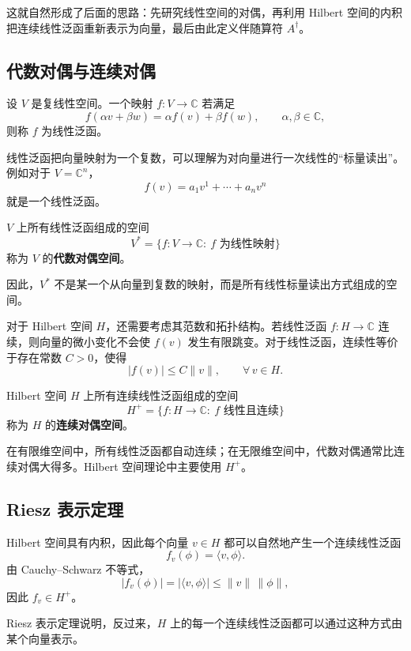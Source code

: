 \documentclass[UTF8,a4paper,11pt,openany]{ctexbook}
\begin{document}
这就自然形成了后面的思路：先研究线性空间的对偶，再利用 Hilbert 空间的内积把连续线性泛函重新表示为向量，最后由此定义伴随算符 $A^\dagger$。

\subsection{代数对偶与连续对偶}

设 $V$ 是复线性空间。一个映射 $f:V\to\mathbb C$ 若满足
\[
f(\alpha v+\beta w)
=
\alpha f(v)+\beta f(w),
\qquad
\alpha,\beta\in\mathbb C,
\]
则称 $f$ 为线性泛函。

线性泛函把向量映射为一个复数，可以理解为对向量进行一次线性的“标量读出”。例如对于 $V=\mathbb C^n$，
\[
f(v)
=
a_1v^1+\cdots+a_nv^n
\]
就是一个线性泛函。

\begin{definition}[代数对偶空间]
$V$ 上所有线性泛函组成的空间
\[
V^*
=
\{f:V\to\mathbb C:\ f\text{ 为线性映射}\}
\]
称为 $V$ 的\textbf{代数对偶空间}。
\end{definition}

因此，$V^*$ 不是某一个从向量到复数的映射，而是所有线性标量读出方式组成的空间。

对于 Hilbert 空间 $H$，还需要考虑其范数和拓扑结构。若线性泛函 $f:H\to\mathbb C$ 连续，则向量的微小变化不会使 $f(v)$ 发生有限跳变。对于线性泛函，连续性等价于存在常数 $C>0$，使得
\[
|f(v)|
\leq
C\|v\|,
\qquad
\forall\,v\in H.
\]

\begin{definition}[连续对偶空间]
Hilbert 空间 $H$ 上所有连续线性泛函组成的空间
\[
H^+
=
\{f:H\to\mathbb C:\ f\text{ 线性且连续}\}
\]
称为 $H$ 的\textbf{连续对偶空间}。
\end{definition}

在有限维空间中，所有线性泛函都自动连续；在无限维空间中，代数对偶通常比连续对偶大得多。Hilbert 空间理论中主要使用 $H^+$。

\subsection{Riesz 表示定理}

Hilbert 空间具有内积，因此每个向量 $v\in H$ 都可以自然地产生一个连续线性泛函
\[
f_v(\phi)
=
\langle v,\phi\rangle.
\]
由 Cauchy--Schwarz 不等式，
\[
|f_v(\phi)|
=
|\langle v,\phi\rangle|
\leq
\|v\|\,\|\phi\|,
\]
因此 $f_v\in H^+$。

Riesz 表示定理说明，反过来，$H$ 上的每一个连续线性泛函都可以通过这种方式由某个向量表示。
\end{document}
